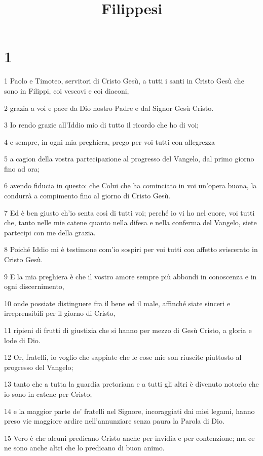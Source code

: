 

\title{Filippesi}


\chapter{1}

\par 1 Paolo e Timoteo, servitori di Cristo Gesù, a tutti i santi in Cristo Gesù che sono in Filippi, coi vescovi e coi diaconi,
\par 2 grazia a voi e pace da Dio nostro Padre e dal Signor Gesù Cristo.
\par 3 Io rendo grazie all'Iddio mio di tutto il ricordo che ho di voi;
\par 4 e sempre, in ogni mia preghiera, prego per voi tutti con allegrezza
\par 5 a cagion della vostra partecipazione al progresso del Vangelo, dal primo giorno fino ad ora;
\par 6 avendo fiducia in questo: che Colui che ha cominciato in voi un'opera buona, la condurrà a compimento fino al giorno di Cristo Gesù.
\par 7 Ed è ben giusto ch'io senta così di tutti voi; perché io vi ho nel cuore, voi tutti che, tanto nelle mie catene quanto nella difesa e nella conferma del Vangelo, siete partecipi con me della grazia.
\par 8 Poiché Iddio mi è testimone com'io sospiri per voi tutti con affetto sviscerato in Cristo Gesù.
\par 9 E la mia preghiera è che il vostro amore sempre più abbondi in conoscenza e in ogni discernimento,
\par 10 onde possiate distinguere fra il bene ed il male, affinché siate sinceri e irreprensibili per il giorno di Cristo,
\par 11 ripieni di frutti di giustizia che si hanno per mezzo di Gesù Cristo, a gloria e lode di Dio.
\par 12 Or, fratelli, io voglio che sappiate che le cose mie son riuscite piuttosto al progresso del Vangelo;
\par 13 tanto che a tutta la guardia pretoriana e a tutti gli altri è divenuto notorio che io sono in catene per Cristo;
\par 14 e la maggior parte de' fratelli nel Signore, incoraggiati dai miei legami, hanno preso vie maggiore ardire nell'annunziare senza paura la Parola di Dio.
\par 15 Vero è che alcuni predicano Cristo anche per invidia e per contenzione; ma ce ne sono anche altri che lo predicano di buon animo.
